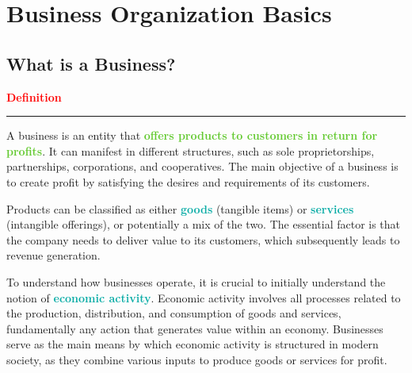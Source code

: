 \documentclass[twoside]{article}
\newcommand{\definition}[1]{\begin{definitionbox} \textcolor{red}{{{\scriptsize\faStar}  \textbf{Definition}} } \newline \rule{\textwidth}{0.5pt} \newline #1 \end{definitionbox}}
\newcommand{\highlightbluetext}[1]{\textcolor[HTML]{09ACA6}{\textbf{#1}}}
\newcommand{\highlightgreentext}[1]{\textcolor[HTML]{62C92F}{\textbf{#1}}}
\numberwithin{equation}{section}
\begin{document}
	\fancyfoot{}

	\fancyfoot[RO, LE]{\thepage}
	
	\setcounter{page}{1}
	
	\tableofcontents
	
	\newpage

	\section{Business Organization Basics}
	\label{sec:BusinessOrganizationBasics}

	\subsection{What is a Business?}
	\label{subsec:WhatIsABusiness}
	\definition{A business is an entity that \highlightgreentext{offers products to customers in return for profits}. It can manifest in different structures, such as sole proprietorships, partnerships, corporations, and cooperatives. The main objective of a business is to create profit by satisfying the desires and requirements of its customers.}
	Products can be classified as either \highlightbluetext{goods} (tangible items) or \highlightbluetext{services} (intangible offerings), or potentially a mix of the two. The essential factor is that the company needs to deliver value to its customers, which subsequently leads to revenue generation. 

	To understand how businesses operate, it is crucial to initially understand the notion of \highlightbluetext{economic activity}. Economic activity involves all processes related to the production, distribution, and consumption of goods and services, fundamentally any action that generates value within an economy. Businesses serve as the main means by which economic activity is structured in modern society, as they combine various inputs to produce goods or services for profit.
\end{document}
